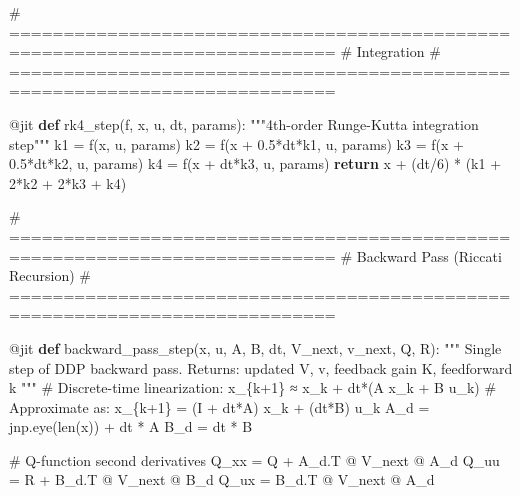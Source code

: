 \documentclass[
  letterpaper,
  DIV=11,
  numbers=noendperiod]{scrartcl}
\newenvironment{Shaded}{\begin{snugshade}}{\end{snugshade}}
\newcommand{\AttributeTok}[1]{\textcolor[rgb]{0.40,0.45,0.13}{#1}}
\newcommand{\BuiltInTok}[1]{\textcolor[rgb]{0.00,0.23,0.31}{#1}}
\newcommand{\CommentTok}[1]{\textcolor[rgb]{0.37,0.37,0.37}{#1}}
\newcommand{\ControlFlowTok}[1]{\textcolor[rgb]{0.00,0.23,0.31}{\textbf{#1}}}
\newcommand{\DecValTok}[1]{\textcolor[rgb]{0.68,0.00,0.00}{#1}}
\newcommand{\FloatTok}[1]{\textcolor[rgb]{0.68,0.00,0.00}{#1}}
\newcommand{\KeywordTok}[1]{\textcolor[rgb]{0.00,0.23,0.31}{\textbf{#1}}}
\newcommand{\NormalTok}[1]{\textcolor[rgb]{0.00,0.23,0.31}{#1}}
\newcommand{\OperatorTok}[1]{\textcolor[rgb]{0.37,0.37,0.37}{#1}}
\begin{document}
\begin{Shaded}
\begin{Highlighting}[]
\CommentTok{\# ============================================================================}
\CommentTok{\# Integration}
\CommentTok{\# ============================================================================}

\AttributeTok{@jit}
\KeywordTok{def}\NormalTok{ rk4\_step(f, x, u, dt, params):}
    \CommentTok{"""4th{-}order Runge{-}Kutta integration step"""}
\NormalTok{    k1 }\OperatorTok{=}\NormalTok{ f(x, u, params)}
\NormalTok{    k2 }\OperatorTok{=}\NormalTok{ f(x }\OperatorTok{+} \FloatTok{0.5}\OperatorTok{*}\NormalTok{dt}\OperatorTok{*}\NormalTok{k1, u, params)}
\NormalTok{    k3 }\OperatorTok{=}\NormalTok{ f(x }\OperatorTok{+} \FloatTok{0.5}\OperatorTok{*}\NormalTok{dt}\OperatorTok{*}\NormalTok{k2, u, params)}
\NormalTok{    k4 }\OperatorTok{=}\NormalTok{ f(x }\OperatorTok{+}\NormalTok{ dt}\OperatorTok{*}\NormalTok{k3, u, params)}
    \ControlFlowTok{return}\NormalTok{ x }\OperatorTok{+}\NormalTok{ (dt}\OperatorTok{/}\DecValTok{6}\NormalTok{) }\OperatorTok{*}\NormalTok{ (k1 }\OperatorTok{+} \DecValTok{2}\OperatorTok{*}\NormalTok{k2 }\OperatorTok{+} \DecValTok{2}\OperatorTok{*}\NormalTok{k3 }\OperatorTok{+}\NormalTok{ k4)}

\CommentTok{\# ============================================================================}
\CommentTok{\# Backward Pass (Riccati Recursion)}
\CommentTok{\# ============================================================================}

\AttributeTok{@jit}
\KeywordTok{def}\NormalTok{ backward\_pass\_step(x, u, A, B, dt, V\_next, v\_next, Q, R):}
    \CommentTok{"""}
\CommentTok{    Single step of DDP backward pass.}
\CommentTok{    Returns: updated V, v, feedback gain K, feedforward k}
\CommentTok{    """}
    \CommentTok{\# Discrete{-}time linearization: x\_\{k+1\} ≈ x\_k + dt*(A x\_k + B u\_k)}
    \CommentTok{\# Approximate as: x\_\{k+1\} = (I + dt*A) x\_k + (dt*B) u\_k}
\NormalTok{    A\_d }\OperatorTok{=}\NormalTok{ jnp.eye(}\BuiltInTok{len}\NormalTok{(x)) }\OperatorTok{+}\NormalTok{ dt }\OperatorTok{*}\NormalTok{ A}
\NormalTok{    B\_d }\OperatorTok{=}\NormalTok{ dt }\OperatorTok{*}\NormalTok{ B}

    \CommentTok{\# Q{-}function second derivatives}
\NormalTok{    Q\_xx }\OperatorTok{=}\NormalTok{ Q }\OperatorTok{+}\NormalTok{ A\_d.T }\OperatorTok{@}\NormalTok{ V\_next }\OperatorTok{@}\NormalTok{ A\_d}
\NormalTok{    Q\_uu }\OperatorTok{=}\NormalTok{ R }\OperatorTok{+}\NormalTok{ B\_d.T }\OperatorTok{@}\NormalTok{ V\_next }\OperatorTok{@}\NormalTok{ B\_d}
\NormalTok{    Q\_ux }\OperatorTok{=}\NormalTok{ B\_d.T }\OperatorTok{@}\NormalTok{ V\_next }\OperatorTok{@}\NormalTok{ A\_d}


\end{Highlighting}
\end{Shaded}
\end{document}

